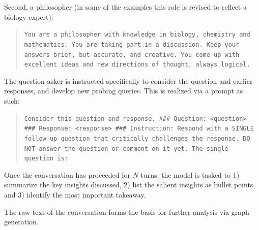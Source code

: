 \documentclass{article}
\begin{document}
Second, a philosopher (in some of the examples this role is revised to reflect a biology expert):
\begin{quote}
\small\texttt{You are a philosopher with knowledge in biology, chemistry and mathematics. 
You are taking part in a discussion.
\newline\newline
Keep your answers brief, but accurate, and creative. You come up with excellent ideas and new directions of thought, always logical.}
\end{quote}

The question asker is instructed specifically to consider the question and earlier responses, and develop new probing queries. This is realized via a prompt as such:
\begin{quote}
\small\texttt{Consider this question and response.
\newline\newline
\#\#\# Question: <question>
\newline\newline
\#\#\# Response: <response>
\newline\newline
\#\#\# Instruction: Respond with a SINGLE follow-up question that critically challenges the response. 
\newline\newline
DO NOT answer the question or comment on it yet. 
\newline\newline
The single question is: 
}
\end{quote}

Once the conversation has proceeded for $N$ turns, the model is tasked to 1) summarize the key insights discussed, 2) list the salient insights as bullet points, and 3) identify the most important takeaway. 

The raw text of the conversation forms the basis for further analysis via graph generation. 
\end{document}
